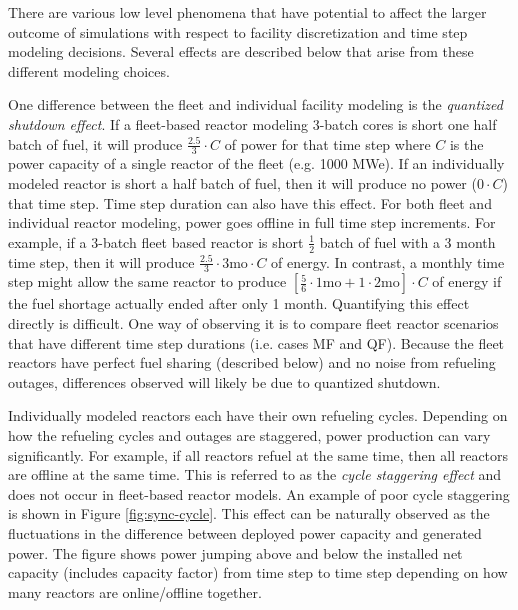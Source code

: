 \documentclass{style}
\begin{document}
There are various low level phenomena that have potential to affect the larger
outcome of simulations with respect to facility discretization and time step modeling
decisions. Several effects are described below that arise from these
different modeling choices.

One difference between the fleet and individual facility modeling is the
\emph{quantized shutdown effect}.  If a fleet-based reactor modeling 3-batch
cores is short one half batch of fuel, it will produce $\frac{2.5}{3}\cdot C$
of power for that time step where $C$ is the power capacity of a single
reactor of the fleet (e.g. 1000 MWe).  If an individually modeled reactor is
short a half batch of fuel, then it will produce no power ($0 \cdot C$) that
time step.  Time step duration can also have this effect.  For both fleet and
individual reactor modeling, power goes offline in full time step increments.
For example, if a 3-batch fleet based reactor is short $\frac{1}{2}$ batch of
fuel with a 3 month time step, then it will produce $\frac{2.5}{3} \cdot 3
\text{mo} \cdot C $ of energy.  In contrast, a monthly time step might allow
the same reactor to produce $[\frac{5}{6} \cdot 1 \text{mo} + 1 \cdot 2
\text{mo}] \cdot C $ of energy if the fuel shortage actually ended after only
1 month.  Quantifying this effect directly is difficult.  One way of observing
it is to compare fleet reactor scenarios that have different time step
durations (i.e. cases MF and QF).  Because the fleet reactors have perfect fuel
sharing (described below) and no noise from refueling outages, differences observed will
likely be due to quantized shutdown.

Individually modeled reactors each have their own refueling cycles.  Depending
on how the refueling cycles and outages are staggered, power production can
vary significantly.  For example, if all reactors refuel at the same time,
then all reactors are offline at the same time.  This is referred to as the
\emph{cycle staggering effect} and does not occur in fleet-based reactor
models.  An example of poor cycle staggering is shown in Figure
\ref{fig:sync-cycle}.  This effect can be naturally observed as the
fluctuations in the difference between deployed power capacity and generated
power.  The figure shows power jumping above and below the installed net
capacity (includes capacity factor) from time step to time step depending on
how many reactors are online/offline together.
\end{document}
